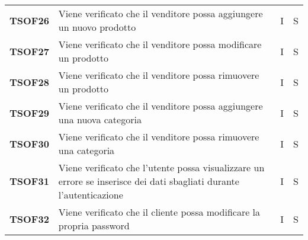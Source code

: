 \begin{center}
\begin{longtable}[!h]{p{60px} p{240px} p{35px} p{35px}}
        \textbf{TSOF26} & Viene verificato che il venditore possa aggiungere un nuovo prodotto                                                & I              & S              \\
        \textbf{TSOF27} & Viene verificato che il venditore possa modificare un prodotto                                                      & I              & S              \\
        \textbf{TSOF28} & Viene verificato che il venditore possa rimuovere un prodotto                                                       & I              & S              \\
        \textbf{TSOF29} & Viene verificato che il venditore possa aggiungere una nuova categoria                                              & I              & S              \\
        \textbf{TSOF30} & Viene verificato che il venditore possa rimuovere una categoria                                                     & I              & S              \\
        \textbf{TSOF31} & Viene verificato che l'utente possa visualizzare un errore se inserisce dei dati sbagliati durante l'autenticazione & I              & S              \\
        \textbf{TSOF32} & Viene verificato che il cliente possa modificare la propria password                                                & I              & S              \\
    \end{longtable}
\end{center}
\pagebreak
